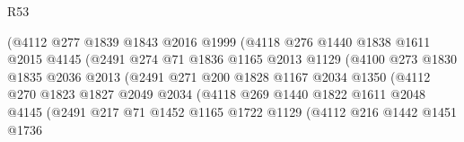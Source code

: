 \begin{lexlean}{R53}
\begin{coremodule}
                              (@4112
                                @277
                                @1839
                                @1843
                                @2016
                                @1999
                                (@4118
                                  @276
                                  @1440
                                  @1838
                                  @1611
                                  @2015
                                  @4145
                                  (@2491
                                    @274
                                    @71
                                    @1836
                                    @1165
                                    @2013
                                    @1129
                                    (@4100
                                      @273
                                      @1830
                                      @1835
                                      @2036
                                      @2013
                                      (@2491
                                        @271
                                        @200
                                        @1828
                                        @1167
                                        @2034
                                        @1350
                                        (@4112
                                          @270
                                          @1823
                                          @1827
                                          @2049
                                          @2034
                                          (@4118
                                            @269
                                            @1440
                                            @1822
                                            @1611
                                            @2048
                                            @4145
                                            (@2491
                                              @217
                                              @71
                                              @1452
                                              @1165
                                              @1722
                                              @1129
                                              (@4112
                                                @216
                                                @1442
                                                @1451
                                                @1736

\end{coremodule}
\end{lexlean}
